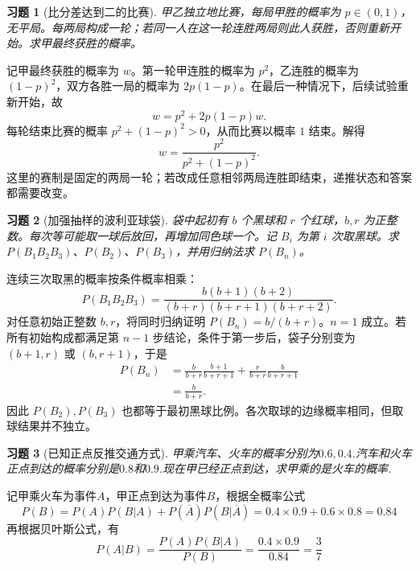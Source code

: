 \documentclass[UTF8,12pt,a4paper,fontset=fandol]{ctexart}
\newtheorem{exercise}{习题}[section]
\begin{document}
\begin{exercise}[比分差达到二的比赛]\label{q:Y2.19}
甲乙独立地比赛，每局甲胜的概率为 $p\in(0,1)$，无平局。每两局构成一轮；若同一人在这一轮连胜两局则此人获胜，否则重新开始。求甲最终获胜的概率。\par{}
\end{exercise}

\begin{solve}\label{a:Y2.19}记甲最终获胜的概率为 $w$。第一轮甲连胜的概率为 $p^2$，乙连胜的概率为 $(1-p)^2$，双方各胜一局的概率为 $2p(1-p)$。在最后一种情况下，后续试验重新开始，故\[w=p^2+2p(1-p)w.\]每轮结束比赛的概率 $p^2+(1-p)^2>0$，从而比赛以概率 $1$ 结束。解得\[w=\frac{p^2}{p^2+(1-p)^2}.\]这里的赛制是固定的两局一轮；若改成任意相邻两局连胜即结束，递推状态和答案都需要改变。\end{solve}

\begin{exercise}[加强抽样的波利亚球袋]\label{q:Y2.20}
袋中起初有 $b$ 个黑球和 $r$ 个红球，$b,r$ 为正整数。每次等可能取一球后放回，再增加同色球一个。记 $B_i$ 为第 $i$ 次取黑球。求 $P(B_1B_2B_3)$、$P(B_2)$、$P(B_3)$，并用归纳法求 $P(B_n)$。\par{}
\end{exercise}

\begin{solve}\label{a:Y2.20}连续三次取黑的概率按条件概率相乘：\[P(B_1B_2B_3)=\frac{b(b+1)(b+2)}{(b+r)(b+r+1)(b+r+2)}.\]对任意初始正整数 $b,r$，将同时归纳证明 $P(B_n)=b/(b+r)$。$n=1$ 成立。若所有初始构成都满足第 $n-1$ 步结论，条件于第一步后，袋子分别变为 $(b+1,r)$ 或 $(b,r+1)$，于是\[\begin{aligned}P(B_n)&=\frac{b}{b+r}\frac{b+1}{b+r+1}+\frac{r}{b+r}\frac{b}{b+r+1}\\&=\frac{b}{b+r}.\end{aligned}\]因此 $P(B_2),P(B_3)$ 也都等于最初黑球比例。各次取球的边缘概率相同，但取球结果并不独立。\end{solve}

\begin{exercise}[已知正点反推交通方式]\label{q:Y2.21}
甲乘汽车、火车的概率分别为$0.6,0.4$.汽车和火车正点到达的概率分别是$0.8$和$0.9$.现在甲已经正点到达，求甲乘的是火车的概率.\par{}
\end{exercise}

\begin{solve}\label{a:Y2.21}
记甲乘火车为事件$A$，甲正点到达为事件$B$，根据全概率公式
\[P(B) = P(A)P(B|A) + P(\overline A )P(B|\overline A ) = 0.4 \times 0.9 + 0.6 \times 0.8 = 0.84\]
再根据贝叶斯公式，有
\[P(A|B) = \frac{{P(A)P(B|A)}}{{P(B)}} = \frac{{0.4 \times 0.9}}{{0.84}} = \frac{3}{7}\]
\end{solve}
\end{document}
